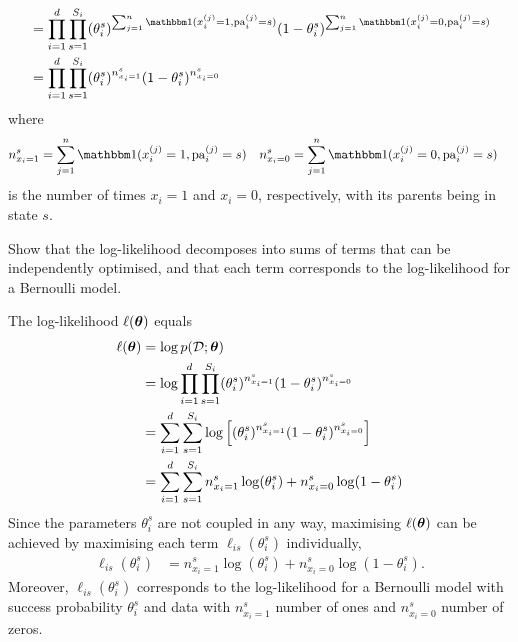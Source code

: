 \begin{exenumerate}
\begin{solution}
\begin{align}
 & = \prod_{i=1}^d \prod_{s=1}^{S_i} (\theta_i^s)^{ \sum_{j=1}^n \ind(x_i^{(j)}=1, \pa_i^{(j)}=s)} (1-\theta_i^s)^{ \sum_{j=1}^n\ind(x_i^{(j)}=0, \pa_i^{(j)}=s)}\\
 & =  \prod_{i=1}^d \prod_{s=1}^{S_i}  (\theta_i^s)^{n_{x_i=1}^s} (1-\theta_i^s)^{n_{x_i=0}^s}
 \end{align}
 where
 \begin{align}
   n_{x_i=1}^s &=  \sum_{j=1}^n\ind(x_i^{(j)}=1, \pa_i^{(j)}=s) & n_{x_i=0}^s &=  \sum_{j=1}^n\ind(x_i^{(j)}=0, \pa_i^{(j)}=s)
 \end{align}
 is the number of times $x_i=1$ and $x_i=0$, respectively, with its parents being in state $s$.

\end{solution}
 
\item \label{q:loglik-fully-observed-dgm-sum-bernoulli}Show that the log-likelihood decomposes into sums of terms that can be independently optimised, and that each term corresponds to the log-likelihood for a Bernoulli model.
  
  \begin{solution}
    The log-likelihood $\ell(\boldsymbol{\theta})$ equals
    \begin{align}
      \ell(\boldsymbol{\theta}) & = \log p(\mathcal{D}; \boldsymbol{\theta}) \\
      & = \log \prod_{i=1}^d \prod_{s=1}^{S_i}  (\theta_i^s)^{n_{x_i=1}^s} (1-\theta_i^s)^{n_{x_i=0}^s}\\
      & = \sum_{i=1}^d \sum_{s=1}^{S_i} \log \left[  (\theta_i^s)^{n_{x_i=1}^s} (1-\theta_i^s)^{n_{x_i=0}^s} \right]\\
      & = \sum_{i=1}^d \sum_{s=1}^{S_i} n_{x_i=1}^s \log (\theta_i^s) + n_{x_i=0}^s \log (1-\theta_i^s)
    \end{align}
    Since the parameters $\theta_i^s$ are not coupled in any way, maximising $\ell(\boldsymbol{\theta})$ can be achieved by maximising each term $\ell_{is}(\theta_i^s)$ individually,
    \begin{align}
      \ell_{is}(\theta_i^s) & = n_{x_i=1}^s \log (\theta_i^s) + n_{x_i=0}^s \log (1-\theta_i^s).
    \end{align}
    Moreover, $\ell_{is}(\theta_i^s)$ corresponds to the log-likelihood for a Bernoulli model with success probability $\theta_i^s$ and data with $n_{x_i=1}^s$ number of ones and $n_{x_i=0}^s$ number of zeros.
    
  \end{solution}


\end{exenumerate}

